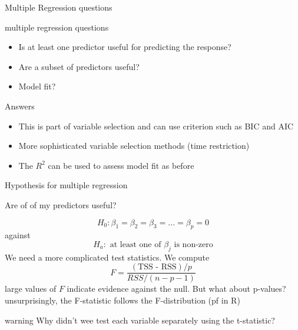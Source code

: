 \documentclass{bredelebeamer}
\begin{document}
\begin{frame}{Multiple Regression questions}

\begin{exampleblock}{multiple regression questions}
	
	\begin{itemize}
\item Is at least one predictor useful for predicting the response?
\item Are a subset of predictors useful?
\item Model fit?
	\end{itemize}
\end{exampleblock}
\begin{block}{Answers}
	
	\begin{itemize}
		\item This is part of variable selection and can use criterion such as BIC and AIC
		\item More sophisticated variable selection methods (time restriction)
		\item The $R^2$ can be used to assess model fit as before
	\end{itemize}

\end{block}
\end{frame}


\begin{frame}{Hypothesis for multiple regression}
\begin{block}{Are of of my predictors useful?}
	
\begin{equation}
H_0: \beta_1 = \beta_2 = \beta_3 = ... = \beta_p = 0
\end{equation}
against
\begin{equation}
H_a: \text{ at least one of $\beta_j$ is non-zero}
\end{equation}
We need a more complicated test statistics. We compute
\begin{equation}
F = \frac{(\text{TSS - RSS})/p}{RSS/(n - p - 1)}
\end{equation}
large values of $F$ indicate evidence against the null. But what about p-values?
unsurprisingly, the F-statistic follows the F-distribution (pf in R)
\end{block}
\begin{alertblock}{warning}
 Why didn't wee test each variable separately using the t-statistic?
\end{alertblock}
\end{frame}
\end{document}
